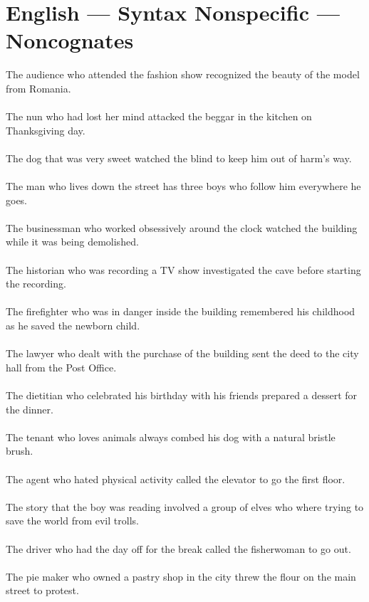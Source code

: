\section{English --- Syntax Nonspecific --- Noncognates}
The audience who attended the fashion show recognized the beauty of the model from Romania.	\\	\\
The nun who had lost her mind attacked the beggar in the kitchen on Thanksgiving day.	\\	\\
The dog that was very sweet watched the blind to keep him out of harm's way.	\\	\\
The man who lives down the street has three boys who follow him everywhere he goes.	\\	\\
The businessman who worked obsessively around the clock watched the building while it was being demolished.	\\	\\
The historian who was recording a TV show investigated the cave before starting the recording.	\\	\\
The firefighter who was in danger inside the building remembered his childhood as he saved the newborn child.	\\	\\
The lawyer who dealt with the purchase of the building sent the deed to the city hall from the Post Office.	\\	\\
The dietitian who celebrated his birthday with his friends prepared a dessert for the dinner.	\\	\\
The tenant who loves animals always combed his dog with a natural bristle brush.	\\	\\
The agent who hated physical activity called the elevator to go the first floor.	\\	\\
The story that the boy was reading involved a group of elves who where trying to save the world from evil trolls.	\\	\\
The driver who had the day off for the break called the fisherwoman to go out.	\\	\\
The pie maker who owned a pastry shop in the city threw the flour on the main street to protest.	\\	\\
